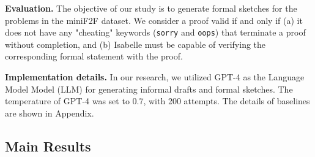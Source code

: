 \documentclass{article} \usepackage{iclr2024_conference,times}
\begin{document}
\textbf{Evaluation.} The objective of our study is to generate formal sketches for the problems in the miniF2F dataset. We consider a proof valid if and only if (a) it does not have any "cheating" keywords (\texttt{sorry} and \texttt{oops}) that terminate a proof without completion, and (b) Isabelle must be capable of verifying the corresponding formal statement with the proof.

\textbf{Implementation details.} In our research, we utilized GPT-4 as the Language Model Model (LLM) for generating informal drafts and formal sketches. The temperature of GPT-4 was set to 0.7, with 200 attempts. The details of baselines are shown in Appendix.

\subsection{Main Results}
\end{document}
